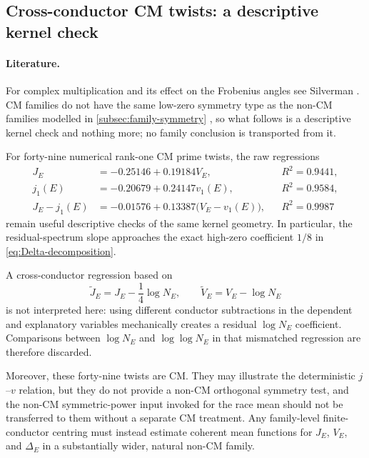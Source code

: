 \documentclass[11pt,reqno]{amsart}
\theoremstyle{remark}
\begin{document}
\subsection{Cross-conductor CM twists: a descriptive kernel check}

\paragraph{Literature.}
For complex multiplication and its effect on the Frobenius angles see Silverman \cite{Silverman2009}.  CM families do not have the same low-zero symmetry type as the non-CM families modelled in \cref{subsec:family-symmetry} \cite{KatzSarnak1999,ILS2000}, so what follows is a descriptive kernel check and nothing more; no family conclusion is transported from it.

For forty-nine numerical rank-one CM prime twists, the raw regressions
\begin{align}
  J_E&=-0.25146+0.19184V_E,&&R^2=0.9441,\label{eq:CM-full-kernel}\\
  j_1(E)&=-0.20679+0.24147v_1(E),&&R^2=0.9584,\label{eq:CM-first-kernel}\\
  J_E-j_1(E)&=-0.01576+0.13387\bigl(V_E-v_1(E)\bigr),&&R^2=0.9987\label{eq:CM-rest-kernel}
\end{align}
remain useful descriptive checks of the same kernel geometry.  In particular, the residual-spectrum slope approaches the exact high-zero coefficient $1/8$ in \eqref{eq:Delta-decomposition}.

A cross-conductor regression based on
\begin{equation}
  \widetilde J_E=J_E-\frac14\log N_E,
  \qquad
  \widetilde V_E=V_E-\log N_E
  \label{eq:centered-variables}
\end{equation}
is not interpreted here: using different conductor subtractions in the dependent and explanatory variables mechanically creates a residual $\log N_E$ coefficient.  Comparisons between $\log N_E$ and $\log\log N_E$ in that mismatched regression are therefore discarded.

Moreover, these forty-nine twists are CM.  They may illustrate the deterministic $j$--$v$ relation, but they do not provide a non-CM orthogonal symmetry test, and the non-CM symmetric-power input invoked for the race mean should not be transferred to them without a separate CM treatment.  Any family-level finite-conductor centring must instead estimate coherent mean functions for $J_E$, $V_E$, and $\Delta_E$ in a substantially wider, natural non-CM family.
\end{document}
